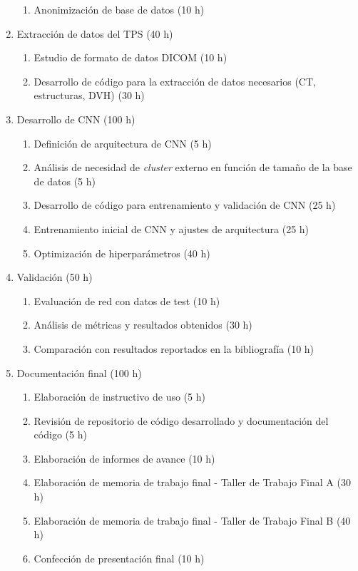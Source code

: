 \documentclass[
11pt, %
codirector, %
]{charter}
\begin{document}
\begin{enumerate}
\begin{enumerate}
	\item Anonimización de base de datos (10 h)
	\end{enumerate}
\newpage 
\item Extracción de datos del TPS (40 h)
	\begin{enumerate}
	\item Estudio de formato de datos DICOM (10 h)
	\item Desarrollo de código para la extracción de datos necesarios (CT, estructuras, DVH) (30 h)
	\end{enumerate}
\item Desarrollo de CNN (100 h)
	\begin{enumerate}
	\item Definición de arquitectura de CNN (5 h)
	\item Análisis de necesidad de \textit{cluster} externo en función de tamaño de la base de datos (5 h)
	\item Desarrollo de código para entrenamiento y validación de CNN (25 h)
	\item Entrenamiento inicial de CNN y ajustes de arquitectura (25 h)
	\item Optimización de hiperparámetros (40 h)
	\end{enumerate}
\item Validación (50 h)
	\begin{enumerate}
	\item Evaluación de red con datos de test (10 h)
	\item Análisis de métricas y resultados obtenidos (30 h)
	\item Comparación con resultados reportados en la bibliografía (10 h)
	\end{enumerate}
\item Documentación final (100 h)
	\begin{enumerate}
	\item Elaboración de instructivo de uso (5 h)
	\item Revisión de repositorio de código desarrollado y documentación del código (5 h)
	\item Elaboración de informes de avance (10 h)
	\item Elaboración de memoria de trabajo final - Taller de Trabajo Final A (30 h)
	\item Elaboración de memoria de trabajo final - Taller de Trabajo Final B (40 h)
	\item Confección de presentación final (10 h)
	\end{enumerate}
\end{enumerate}
\end{document}
